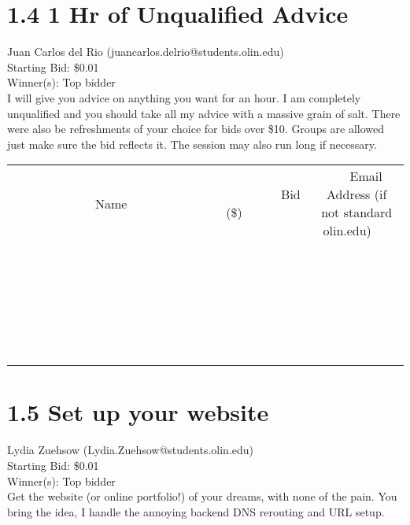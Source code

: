 \documentclass[11pt]{article}
\begin{document}
\section*{1.4 1 Hr of Unqualified Advice}
Juan Carlos del Rio (juancarlos.delrio@students.olin.edu) \\
Starting Bid: \$0.01 \\
Winner(s): 
Top bidder \\
I will give you advice on anything you want for an hour. I am completely unqualified and you should take all my advice with a massive grain of salt. There were also be refreshments of your choice for bids over \$10. Groups are allowed just make sure the bid reflects it. The session may also run long if necessary. \\[6ex]
\begin{tabular}{c c c}
~~~~~~~~~~~~~Name~~~~~~~~~~~~~ & ~~~~~~~~~Bid (\$)~~~~~~~~~ & ~~~Email Address (if not standard olin.edu)~~~ \\
 & & \\
\hline
 & & \\
\hline
 & & \\
\hline
 & & \\
\hline
 & & \\
\hline
 & & \\
\hline
 & & \\
\hline
 & & \\
\hline
 & & \\
\hline
 & & \\
\hline
 & & \\
\hline
 & & \\
\hline
 & & \\
\hline
 & & \\
\hline
 & & \\
\hline
 & & \\
\hline
 & & \\
\hline
 & & \\
\hline
 & & \\
\hline
 & & \\
\hline
 & & \\
\hline
 & & \\
\hline
 & & \\
\hline
 & & \\
\hline
 & & \\
\hline
 & & \\
\hline
\end{tabular}
\clearpage
\section*{1.5 Set up your website}
Lydia Zuehsow (Lydia.Zuehsow@students.olin.edu) \\
Starting Bid: \$0.01 \\
Winner(s): 
Top bidder \\
Get the website (or online portfolio!) of your dreams, with none of the pain.
You bring the idea, I handle the annoying backend DNS rerouting and URL setup.
\end{document}
